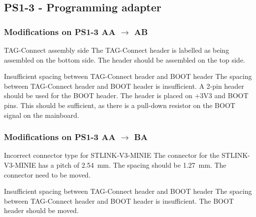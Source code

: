\FloatBarrier

\subsection{PS1-3 - Programming adapter}

\subsubsection{Modifications on PS1-3 AA $\to$ AB}

\begin{ModTable}

\ModItemOpen
{TAG-Connect assembly side}
{The TAG-Connect header is labelled as being assembled on the bottom side. }
{The header should be assembled on the top side. }
{}
{}

\ModItemOpen
{Insufficient spacing between TAG-Connect header and BOOT header}
{The spacing between TAG-Connect header and BOOT header is insufficient. }
{A 2-pin header should be used for the BOOT header. The header is placed on +3V3 and BOOT pins. This should be sufficient, as there is a pull-down resistor on the BOOT signal on the mainboard. }
{}
{}

\end{ModTable}

\FloatBarrier

\subsubsection{Modifications on PS1-3 AA $\to$ BA}

\begin{ModTable}

\ModItemOpen
{Incorrect connector type for STLINK-V3-MINIE}
{The connector for the STLINK-V3-MINIE has a pitch of \qty{2.54}{\milli\meter}. The spacing should be \qty{1.27}{\milli\meter}. }
{The connector need to be moved. }
{}
{}

\ModItemOpen
{Insufficient spacing between TAG-Connect header and BOOT header}
{The spacing between TAG-Connect header and BOOT header is insufficient. }
{The BOOT header should be moved. }
{}
{}

\end{ModTable}

\FloatBarrier

